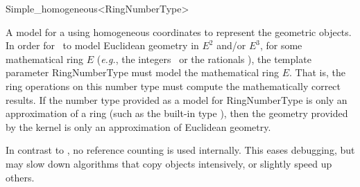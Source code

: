 \begin{ccRefClass}{Simple_homogeneous<RingNumberType>}

\ccDefinition
A model for a  using homogeneous coordinates to represent the
geometric objects. In order for \ccRefName\ to model Euclidean geometry
in $E^2$ and/or $E^3$, for some mathematical ring $E$ (\textit{e.g.},
the integers \Z\ or the rationals \Q), the template parameter RingNumberType
must model the mathematical ring $E$.  That is, the ring operations on this
number type must compute the mathematically correct results.  If the number
type provided as a model for RingNumberType is only an approximation of a
ring (such as the built-in type ), then the geometry provided by
the kernel is only an approximation of Euclidean geometry.



\ccIsModel
{}

\ccTypes
{}
\ccGlue
{}

\ccImplementation In contrast to , no reference counting
is used internally. This eases debugging, but may slow down algorithms
that copy objects intensively, or slightly speed up others.

\ccSeeAlso
{} \\
 \\
 \\
\end{ccRefClass}
